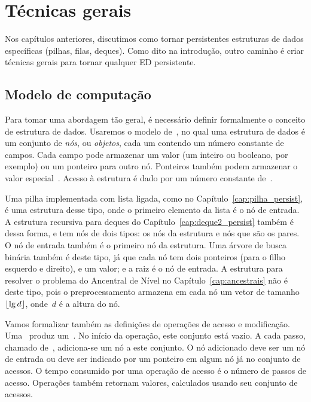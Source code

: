 \documentclass[main.tex]{subfiles}
\begin{document}
\chapter{Técnicas gerais} \label{cap:geral_persist}

Nos capítulos anteriores, discutimos como tornar persistentes estruturas de dados específicas (pilhas, filas, deques). Como dito na introdução, outro caminho é criar técnicas gerais para tornar qualquer ED persistente.


\section{Modelo de computação}

Para tomar uma abordagem tão geral, é necessário definir formalmente o conceito de estrutura de dados.  Usaremos o modelo de~, no qual uma estrutura de dados é um conjunto de \emph{nós}, ou \emph{objetos}, cada um contendo um número constante de campos. Cada campo pode armazenar um valor (um inteiro ou booleano, por exemplo) ou um ponteiro para outro nó. Ponteiros também podem armazenar o valor especial~.  Acesso à estrutura é dado por um número constante de~.

Uma pilha implementada com lista ligada, como no Capítulo~\ref{cap:pilha_persist}, é uma estrutura desse tipo, onde o primeiro elemento da lista é o nó de entrada. A estrutura recursiva para deques do Capítulo~\ref{cap:deque2_persist} também é dessa forma, e tem nós de dois tipos: os nós da estrutura e nós que são os pares. O nó de entrada também é o primeiro nó da estrutura.  Uma árvore de busca binária também é deste tipo, já que cada nó tem dois ponteiros (para o filho esquerdo e direito), e um valor; e a raiz é o nó de entrada. A estrutura para resolver o problema do Ancentral de Nível no Capítulo~\ref{cap:ancestrais} não é deste tipo, pois o preprocessamento armazena em cada nó um vetor de tamanho~$\lfloor\lg d\rfloor$, onde~$d$ é a altura do nó.

Vamos formalizar também as definições de operações de acesso e modificação. Uma~ produz um~. No início da operação, este conjunto está vazio.  A cada passo, chamado de~, adiciona-se um nó a este conjunto. O nó adicionado deve ser um nó de entrada ou deve ser indicado por um ponteiro em algum nó já no conjunto de acessos. O tempo consumido por uma operação de acesso é o número de passos de acesso. Operações também retornam valores, calculados usando seu conjunto de acessos.
\end{document}
